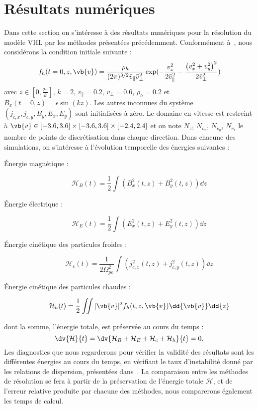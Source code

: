 
\section{Résultats numériques}

Dans cette section on s'intéresse à des résultats numériques pour la résolution du modèle VHL par les méthodes présentées précédemment. Conformément à~\cite{Holderied:2020}, nous considérons la condition initiale suivante :
$$
  f_h(t=0,z,\vb{v}) = \frac{\rho_h}{(2\pi)^{3/2}\bar{v}_{\|}\bar{v}_\perp^2}\exp( - \frac{v_z^2}{2\bar{v}_{\|}^2} - \frac{\left( v_x^2 + v_y^2 \right)^2}{2\bar{v}_\perp^2} )
$$
avec $z\in[0,\frac{2\pi}{k}]$, $k=2$, $\bar{v}_{\|}=0.2$, $\bar{v}_\perp=0.6$, $\rho_h=0.2$ et $B_x(t=0,z)=\epsilon\sin(kz)$. Les autres inconnues du système $(j_{c,x},j_{c,y},B_y,E_x,E_y)$ sont initialisées à zéro. Le domaine en vitesse est restreint à $\vb{v}\in[-3.6,3.6]\times[-3.6,3.6]\times[-2.4,2.4]$ et on note $N_z$, $N_{v_x}$, $N_{v_y}$, $N_{v_z}$ le nombre de points de discrétisation dans chaque direction. Dans chacune des simulations, on s'intéresse à l'évolution temporelle des énergies suivantes :
\begin{description}
  \item[Énergie magnétique : ] \begin{equation}\label{eq:3:nrj:me}\mathcal{H}_B(t) = \frac{1}{2}\int \left( B_x^2(t,z) + B_y^2(t,z) \right)\dd{z}\end{equation}
  \item[Énergie électrique : ] \begin{equation}\label{eq:3:nrj:ee}\mathcal{H}_E(t) = \frac{1}{2}\int \left( E_x^2(t,z) + E_y^2(t,z) \right)\dd{z}\end{equation}
  \item[Énergie cinétique des particules froides : ] \begin{equation}\label{eq:3:nrj:ce}\mathcal{H}_c(t) = \frac{1}{2\Omega_{pe}^2}\int \left( j_{c,x}^2(t,z) + j_{c,y}^2(t,z) \right)\dd{z}\end{equation}
  \item[Énergie cinétique des particules chaudes :  ] \begin{equation}\label{eq:3:nrj:he}\mathcal{H}_h(t) = \frac{1}{2}\iint |\vb{v}|^2 f_h(t,z,\vb{v}) \dd{\vb{v}}\dd{z}\end{equation}
\end{description}
dont la somme, l'énergie totale, est préservée au cours du temps :
$$
  \dv{\mathcal{H}}{t} = \dv{\mathcal{H}_B+\mathcal{H}_E+\mathcal{H}_c+\mathcal{H}_h}{t} = 0.
$$
Les diagnostics que nous regarderons pour vérifier la validité des résultats sont les différentes énergies au cours du temps, en vérifiant le taux d'instabilité donné par les relations de dispersion, présentées dans~\cite{Holderied:2020}. La comparaison entre les méthodes de résolution se fera à partir de la préservation de l'énergie totale $\mathcal{H}$, et de l'erreur relative produite par chacune des méthodes, nous comparerons également les temps de calcul.

